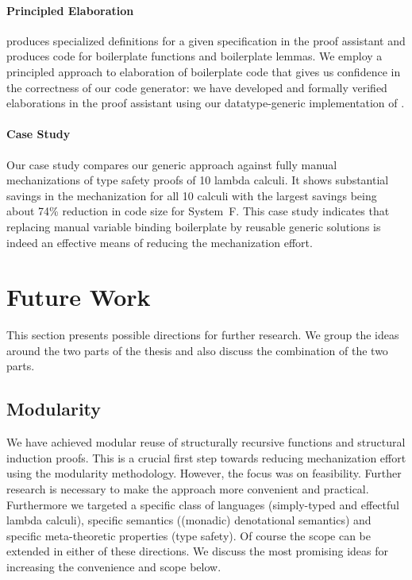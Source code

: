 \paragraph{Principled Elaboration}
\Needle produces specialized definitions for a given \Knot specification in the
\Coq proof assistant and produces code for boilerplate functions and boilerplate
lemmas. We employ a principled approach to elaboration of boilerplate code that
gives us confidence in the correctness of our code generator: we have developed
and formally verified elaborations in the \Coq proof assistant using our
datatype-generic implementation \Loom of \Knot.

\paragraph{Case Study}
Our case study compares our generic approach against fully manual mechanizations
of type safety proofs of 10 lambda calculi. It shows substantial savings in the
mechanization for all 10 calculi with the largest savings being about 74\%
reduction in code size for System~F. This case study indicates that replacing
manual variable binding boilerplate by reusable generic solutions is indeed an
effective means of reducing the mechanization effort.


\section{Future Work}

This section presents possible directions for further research. We group the
ideas around the two parts of the thesis and also discuss the combination of the
two parts.

\subsection{Modularity}

We have achieved modular reuse of structurally recursive functions and
structural induction proofs. This is a crucial first step towards reducing
mechanization effort using the modularity methodology. However, the focus was on
feasibility. Further research is necessary to make the approach more convenient
and practical. Furthermore we targeted a specific class of languages
(simply-typed and effectful lambda calculi), specific semantics ((monadic)
denotational semantics) and specific meta-theoretic properties (type safety). Of
course the scope can be extended in either of these directions. We discuss the
most promising ideas for increasing the convenience and scope below.

